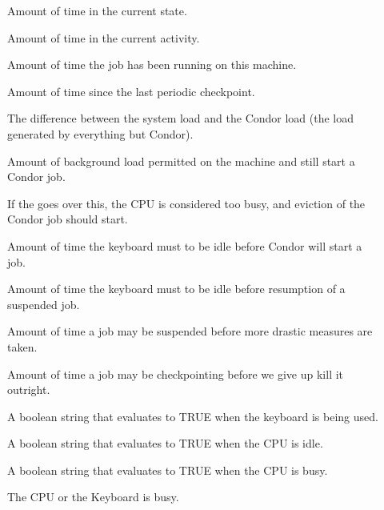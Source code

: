 \begin{description}
  
\item[] Amount of time in the current state.

\item[] Amount of time in the current activity. 

\item[] Amount of time the job has been running on
  this machine.

\item[] Amount of time since the last periodic checkpoint.

\item[] The difference between the system load and
  the Condor load (the load generated by everything but Condor).

\item[] Amount of background load permitted
  on the machine and still start a Condor job.

\item[] If the  goes over
  this, the CPU is considered too busy, and eviction of the Condor
  job should start. 

\item[] Amount of time the keyboard must to be idle
  before Condor will start a job.

\item[] Amount of time the keyboard must to be idle
  before resumption of a suspended job.

\item[] Amount of time a job may be
  suspended before more drastic measures are taken.

\item[] Amount of time a job may be
  checkpointing before we give up kill it outright.

\item[] A boolean string that evaluates to TRUE
    when the keyboard is being used.

\item[] A boolean string that evaluates to TRUE
    when the CPU is idle.

\item[] A boolean string that evaluates to TRUE
    when the CPU is busy.

\item[] The CPU or the Keyboard is busy.

\end{description}


